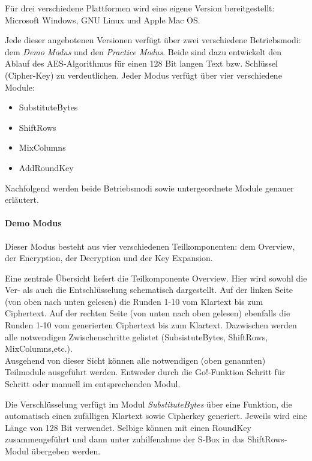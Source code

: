    Für drei verschiedene Plattformen wird eine eigene Version bereitgestellt:
   Microsoft Windows, GNU Linux und Apple Mac OS.

   Jede dieser angebotenen Versionen verfügt über zwei verschiedene Betriebsmodi: dem \textit{Demo Modus}
   und den \textit{Practice Modus}. Beide sind dazu entwickelt den Ablauf des AES-Algorithmus für
   einen 128 Bit langen Text bzw. Schlüssel (Cipher-Key) zu verdeutlichen\cite{michiganuni}.
   Jeder Modus verfügt über vier verschiedene Module:

   \begin{itemize}
      \item SubstituteBytes
      \item ShiftRows
      \item MixColumns
      \item AddRoundKey
   \end{itemize}

   Nachfolgend werden beide Betriebsmodi sowie untergeordnete Module genauer erläutert.

   \paragraph{Demo Modus}
   Dieser Modus besteht aus vier verschiedenen Teilkomponenten: dem Overview, der Encryption,
   der Decryption und der Key Expansion.

   Eine zentrale Übersicht liefert die Teilkomponente Overview. Hier wird sowohl die Ver- als auch die
   Entschlüsselung schematisch dargestellt. Auf der linken Seite (von oben nach unten gelesen) die
   Runden 1-10 vom Klartext bis zum Ciphertext. Auf der rechten Seite (von unten nach oben gelesen)
   ebenfalls die Runden 1-10 vom generierten Ciphertext bis zum Klartext. Dazwischen werden alle
   notwendigen Zwischenschritte gelistet (SubsistuteBytes, ShiftRows, MixColumns,etc.). \\
   Ausgehend von dieser Sicht können alle notwendigen (oben genannten) Teilmodule ausgeführt werden.
   Entweder durch die Go!-Funktion Schritt für Schritt oder manuell im entsprechenden Modul.

   Die Verschlüsselung verfügt im Modul \textit{SubstituteBytes} über eine Funktion,
   die automatisch einen zufälligen Klartext sowie
   Cipherkey generiert. Jeweils wird eine Länge von 128 Bit verwendet.
   Selbige können mit einen RoundKey zusammengeführt und dann unter zuhilfenahme
   der S-Box in das ShiftRows-Modul übergeben werden.

